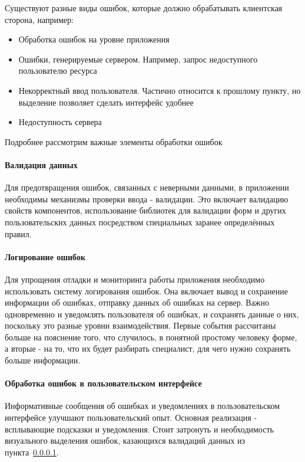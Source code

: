 \documentclass[a4paper,article]{article}
\begin{document}
    Существуют разные виды ошибок, которые должно обрабатывать клиентская сторона, например:

    \begin{itemize}[nolistsep]
        \item Обработка ошибок на уровне приложения
        \item Ошибки, генерируемые сервером. Например, запрос недоступного пользователю ресурса
        \item Некорректный ввод пользователя. Частично относится к прошлому пункту, но выделение позволяет сделать интерфейс удобнее
        \item Недоступность сервера
    \end{itemize}

    Подробнее рассмотрим важные элементы обработки ошибок

    \paragraph{Валидация данных}\label{Проектирование клиента. Валидация данных}

    Для предотвращения ошибок, связанных с неверными данными, в приложении необходимы механизмы проверки ввода - валидации. Это включает валидацию свойств компонентов, использование библиотек для валидации форм и других пользовательских данных посредством специальных заранее определённых правил.

    \paragraph{Логирование ошибок}

    Для упрощения отладки и мониторинга работы приложения необходимо использовать систему логирования ошибок. Она включает вывод и сохранение информации об ошибках, отправку данных об ошибках на сервер. Важно одновременно и уведомлять пользователя об ошибках, и сохранять данные о них, поскольку это разные уровни взаимодействия. Первые события рассчитаны больше на пояснение того, что случилось, в понятной простому человеку форме, а вторые - на то, что их будет разбирать специалист, для чего нужно сохранять больше информации.

    \paragraph{Обработка ошибок в пользовательском интерфейсе}

    Информативные сообщения об ошибках и уведомлениях в пользовательском интерфейсе улучшают пользовательский опыт. Основная реализация - всплывающие подсказки и уведомления. Стоит затронуть и необходимость визуального выделения ошибок, казающихся валидаций данных из пункта~\ref{Проектирование клиента. Валидация данных}.
\end{document}
